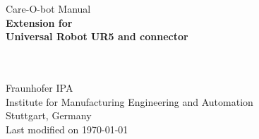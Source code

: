 %
%
\begin{titlepage}
\vspace*{13mm}
\begin{center}
  \vspace{10mm} 
         {\large \hspace{20mm} Care-O-bot Manual\\}
  \vspace{10mm}
       {\Large
          \bf
          \hspace{20mm} Extension for\\} 
  \vspace{5mm}
       {\Large
          \bf
          \hspace{20mm} Universal Robot UR5 and connector\\}

  \vspace{80mm}
  \makebox[40mm]{}\\
  \makebox[40mm]{}\\
  \vspace{10mm}
         {\large \hspace{20mm} Fraunhofer IPA} \\
  \vspace{5mm}
         {\large \hspace{20mm} Institute for Manufacturing Engineering and Automation} \\
         {\large \hspace{20mm} Stuttgart, Germany} \\
  \vfill
         {\large \hspace{20mm} Last modified on \today}
\end{center}
\end{titlepage}

\clearpage
\thispagestyle{empty}
\cleardoublepage
